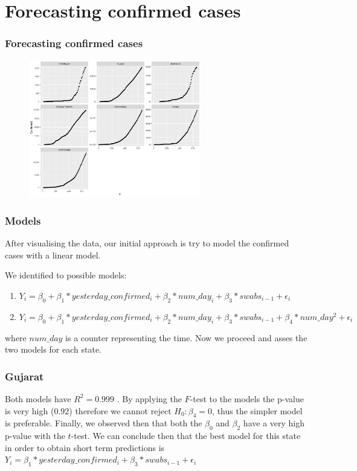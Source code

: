 \documentclass{beamer}
\begin{document}
\section{Forecasting confirmed cases}
\begin{frame}
\frametitle{Forecasting confirmed cases}
\begin{figure}
	\includegraphics[width=\linewidth, height=6cm]{../plots/confirmed_facets.png}
\end{figure}
\end{frame}

\begin{frame}
\frametitle{Models}
After visualising the data, our initial approach is try to model the confirmed cases with a linear model. 

We identified to possible models:
\begin{enumerate}
	\item $ Y_i = \beta_0 + \beta_1*yesterday\_confirmed_i + \beta_2*num\_day_i + \beta_3*swabs_{i-1} + \epsilon_i$
	\item $ Y_i = \beta_0 + \beta_1*yesterday\_confirmed_i + \beta_2*num\_day_i + \beta_3*swabs_{i-1} + \beta_4*num\_day^2 + \epsilon_i $
\end{enumerate}
where $num\_day$ is a counter representing the time.
Now we proceed and asses the two models for each state.
\end{frame}

\begin{frame}
\frametitle{Gujarat}
Both models have $R^2 = 0.999$ .
By applying the $F$-test to the models the p-value is very high ($0.92$) therefore we cannot reject $H_0: \beta_4 = 0$, thus the simpler model is preferable. Finally, we observed then that both the $\beta_0$ and $\beta_2$ have a very high p-value with the $t$-test. We can conclude then that the best model for this state in order to obtain short term predictions is $Y_i = \beta_1*yesterday\_confirmed_i+\beta_3*swabs_{i-1}+\epsilon_i$
\end{frame}
\end{document}

